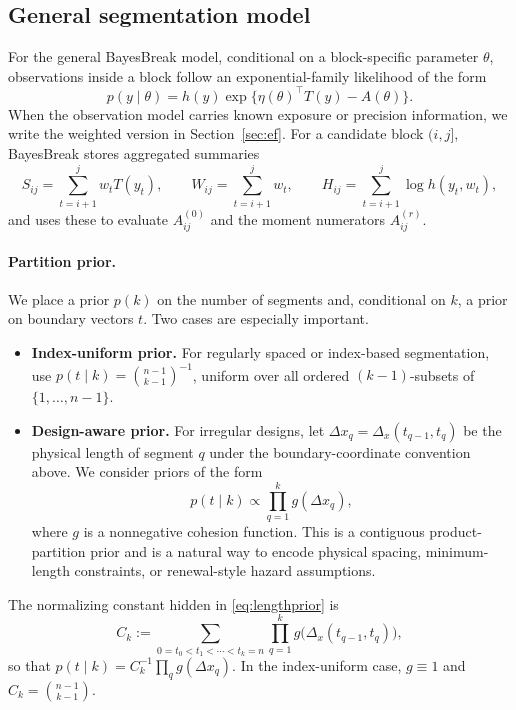\subsection{General segmentation model}
\label{subsec:general-setup}

For the general BayesBreak model, conditional on a block-specific parameter $\theta$, observations
inside a block follow an exponential-family likelihood of the form
\begin{equation}
p(y\mid \theta)=h(y)\exp\{\eta(\theta)^\top T(y)-A(\theta)\}.
\label{eq:EFbasic}
\end{equation}
When the observation model carries known exposure or precision information, we write the weighted
version in Section~\ref{sec:ef}. For a candidate block $(i,j]$, BayesBreak stores aggregated
summaries
\[
S_{ij}=\sum_{t=i+1}^j w_t T(y_t),
\qquad
W_{ij}=\sum_{t=i+1}^j w_t,
\qquad
H_{ij}=\sum_{t=i+1}^j \log h(y_t,w_t),
\]
and uses these to evaluate $A^{(0)}_{ij}$ and the moment numerators $A^{(r)}_{ij}$.

\paragraph{Partition prior.}
We place a prior $p(k)$ on the number of segments and, conditional on $k$, a prior on boundary
vectors $t$.
Two cases are especially important.
\begin{itemize}
\item \textbf{Index-uniform prior.}
For regularly spaced or index-based segmentation, use
$p(t\mid k)=\binom{n-1}{k-1}^{-1}$, uniform over all ordered $(k-1)$-subsets of
$\{1,\dots,n-1\}$.

\item \textbf{Design-aware prior.}
For irregular designs, let $\Delta x_q=\Delta_x(t_{q-1},t_q)$ be the physical length of segment
$q$ under the boundary-coordinate convention above. We consider priors of the form
\begin{equation}
p(t\mid k) \propto \prod_{q=1}^k g(\Delta x_q),
\label{eq:lengthprior}
\end{equation}
where $g$ is a nonnegative cohesion function. This is a contiguous product-partition prior and is
a natural way to encode physical spacing, minimum-length constraints, or renewal-style hazard
assumptions.
\end{itemize}

The normalizing constant hidden in \eqref{eq:lengthprior} is
\begin{equation}
C_k := \sum_{0=t_0<t_1<\cdots<t_k=n} \prod_{q=1}^k g\bigl(\Delta_x(t_{q-1},t_q)\bigr),
\label{eq:Ck-setup}
\end{equation}
so that $p(t\mid k)=C_k^{-1}\prod_q g(\Delta x_q)$. In the index-uniform case, $g\equiv 1$ and
$C_k=\binom{n-1}{k-1}$.

